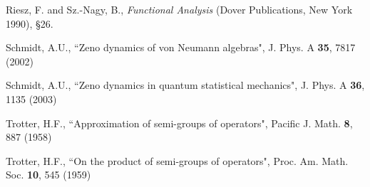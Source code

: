 \documentclass[aip,jmp,12pt
]{revtex4}
\theoremstyle{definition}
\begin{document}
\begin{thebibliography}{20}
Riesz, F. and  Sz.-Nagy, B.,
\textit{Functional Analysis} (Dover Publications, New York 1990), \S 26.


Schmidt, A.U.,
{``Zeno dynamics of von Neumann algebras"},
J. Phys. A {\bf 35}, 7817 (2002)


Schmidt, A.U.,
{``Zeno dynamics in quantum statistical mechanics"},
J. Phys. A {\bf 36}, 1135 (2003)

Trotter, H.F.,
{``Approximation of semi-groups of operators"},
Pacific J. Math.  \textbf{8}, 887  (1958)

Trotter, H.F.,
{``On the product of semi-groups of operators"},
Proc. Am. Math. Soc. \textbf{10}, 545 (1959)



\end{thebibliography}
\end{document}
